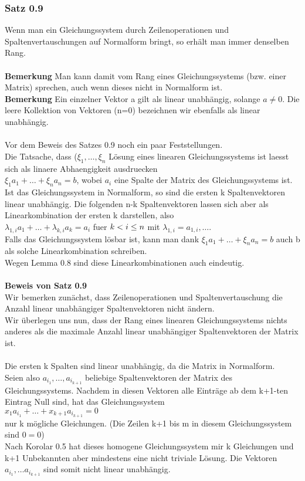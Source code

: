 \documentclass{article}
\newcommand{\lb}{\lambda}
\begin{document}
\subsubsection{Satz 0.9}
Wenn man ein Gleichungssystem durch Zeilenoperationen und Spaltenvertauschungen auf Normalform bringt, so erhält man immer denselben Rang.\\
\\
\textbf{Bemerkung} Man kann damit vom Rang eines Gleichungssystems (bzw. einer Matrix) sprechen, auch wenn dieses nicht in Normalform ist.\\
\textbf{Bemerkung} Ein einzelner Vektor a gilt als linear unabhängig, solange $a \neq 0$. Die leere Kollektion von Vektoren (n=0) bezeichnen wir ebenfalls als linear unabhängig.\\
\\
Vor dem Beweis des Satzes 0.9 noch ein paar Feststellungen.\\
Die Tatsache, dass ($\xi_1, \dots, \xi_n$ Lösung eines linearen Gleichungssystems ist laesst sich als linaere Abhaengigkeit ausdruecken\\
$\xi_1a_1 + \dots + \xi_n a_n = b$, wobei $a_i$ eine Spalte der Matrix des Gleichungssystems ist.\\
Ist das Gleichungssystem in Normalform, so sind die ersten k Spaltenvektoren linear unabhängig. Die folgenden n-k Spaltenvektoren lassen sich aber als Linearkombination der ersten k darstellen, also\\
$
\lb_{1,i}a_1 + \dots + \lb_{k,i}a_k = a_i $ fuer $ k < i \le n\\
$ mit $ \lb_{1,i} = a_{1,i}, \dots
$.
\\
Falls das Gleichungssystem lösbar ist, kann man dank $\xi_1a_1 + \dots + \xi_n a_n = b$ auch b als solche Linearkombination schreiben.\\
Wegen Lemma 0.8 sind diese Linearkombinationen auch eindeutig.\\
\\
\textbf{Beweis von Satz 0.9}\\
Wir bemerken zunächst, dass Zeilenoperationen und Spaltenvertauschung die Anzahl linear unabhängiger Spaltenvektoren nicht ändern.\\
Wir überlegen uns nun, dass der Rang eines linearen Gleichungssystems nichts anderes als die maximale Anzahl linear unabhängiger Spaltenvektoren der Matrix ist.\\
\\
Die ersten k Spalten sind linear unabhängig, da die Matrix in Normalform.\\
Seien also $a_{i_1}, \dots, a_{i_{k+1}}$ beliebige Spaltenvektoren der Matrix des Gleichungssystems. Nachdem in diesen Vektoren alle Einträge ab dem k+1-ten Eintrag Null sind, hat das Gleichungssystem \\
$
x_1a_{i_1} + \dots + x_{k+1}a_{i_{k+1}} = 0
$\\
nur k mögliche Gleichungen. (Die Zeilen k+1 bis m in diesem Gleichungssystem sind $0=0$)\\
Nach Korolar 0.5 hat dieses homogene Gleichungssystem mir k Gleichungen und k+1 Unbekannten aber mindestens eine nicht triviale Lösung. Die Vektoren $a_{i_1}, \dots a_{i_{k+1}}$ sind somit nicht linear unabhängig.
\end{document}
